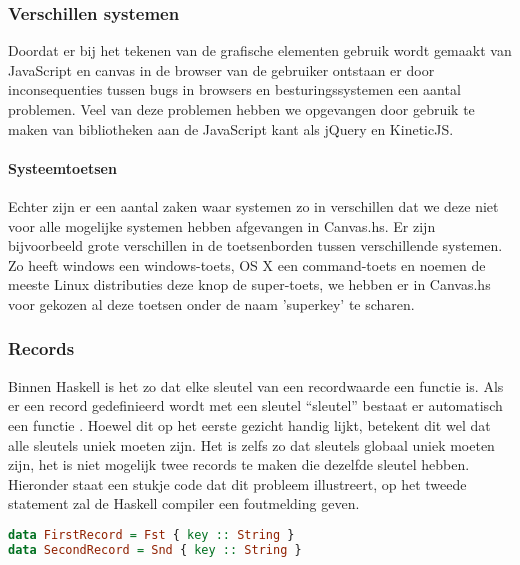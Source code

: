 \subsubsection{Verschillen systemen}
Doordat er bij het tekenen van de grafische elementen gebruik wordt gemaakt van JavaScript en canvas in de browser van de gebruiker ontstaan er door inconsequenties tussen bugs in browsers en besturingssystemen een aantal problemen. Veel van deze problemen hebben we opgevangen door gebruik te maken van bibliotheken aan de JavaScript kant als jQuery en KineticJS. 

\paragraph{Systeemtoetsen} Echter zijn er een aantal zaken waar systemen zo in verschillen dat we deze niet voor alle mogelijke systemen hebben afgevangen in Canvas.hs. Er zijn bijvoorbeeld grote verschillen in de toetsenborden tussen verschillende systemen. Zo heeft windows een windows-toets, OS X een command-toets en noemen de meeste Linux distributies deze knop de super-toets, we hebben er in Canvas.hs voor gekozen al deze toetsen onder de naam 'superkey' te scharen.

\subsubsection{Records}
Binnen Haskell is het zo dat elke sleutel van een recordwaarde een functie is. Als er een record gedefinieerd wordt met een sleutel ``sleutel'' bestaat er automatisch een functie . Hoewel dit op het eerste gezicht handig lijkt, betekent dit wel dat alle sleutels uniek moeten zijn. Het is zelfs zo dat sleutels globaal uniek moeten zijn, het is niet mogelijk twee records te maken die dezelfde sleutel hebben. Hieronder staat een stukje code dat dit probleem illustreert, op het tweede statement zal de Haskell compiler een foutmelding geven.

\begin{lstlisting}[language=Haskell]
data FirstRecord = Fst { key :: String }
data SecondRecord = Snd { key :: String }
\end{lstlisting}

